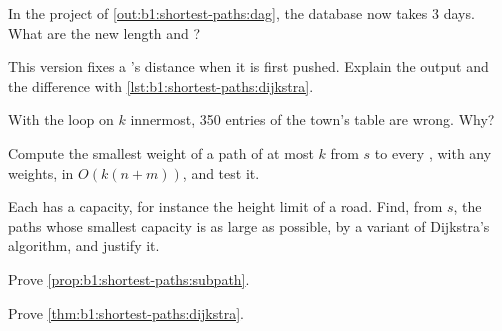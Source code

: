 \begin{exercise}[$\star$]\label{exo:b1:shortest-paths:4}
In the project of \cref{out:b1:shortest-paths:dag}, the database now takes 3 days. What are the new length and ?
\end{exercise}

\begin{exercise}[$\star\star$]\label{exo:b1:shortest-paths:5}
This version fixes a 's distance when it is first pushed. Explain the output and the difference with
\cref{lst:b1:shortest-paths:dijkstra}.
\end{exercise}

\begin{exercise}[$\star\star$]\label{exo:b1:shortest-paths:6}
With the loop on $k$ innermost, 350 entries of the town's table are wrong. Why?
\end{exercise}

\begin{exercise}[$\star\star$]\label{exo:b1:shortest-paths:7}
Compute the smallest weight of a path of at most $k$  from $s$ to every , with any weights, in $O(k(n + m))$,
and test it.
\end{exercise}

\begin{exercise}[$\star\star$]\label{exo:b1:shortest-paths:8}
Each  has a capacity, for instance the height limit of a road. Find, from $s$, the paths whose smallest capacity is
as large as possible, by a variant of Dijkstra's algorithm, and justify it.
\end{exercise}

\begin{exercise}[$\star\star$]\label{exo:b1:shortest-paths:9}
Prove \cref{prop:b1:shortest-paths:subpath}.
\end{exercise}

\begin{exercise}[$\star\star\star$]\label{exo:b1:shortest-paths:10}
Prove \cref{thm:b1:shortest-paths:dijkstra}.
\end{exercise}

